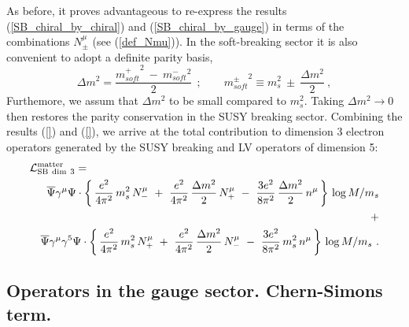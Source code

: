 \documentclass[paper,12pt]{revtex4}
\begin{document}
	As before, it proves advantageous to re-express the results (\ref{SB_chiral_by_chiral})
	and (\ref{SB_chiral_by_gauge}) in terms of the combinations
	$ N_\pm^\mu $ (see (\ref{def_Nmu})).  In the soft-breaking sector it is also convenient 
	to adopt a definite parity basis,
\begin{equation}
	\Delta m^2 = \frac{ {m_{soft}^+}^2 ~ - ~ {m_{soft}^-}^2 }
			  {                  2                  }~~;
	\qquad
	{m_{soft}^\pm}^2 \equiv m_s^2 ~\pm~ \frac{\Delta m^2}{2}~,
\end{equation}
	Furthemore, we assum that  $ \Delta m^2 $ to be small compared to $m_s^2$. 
	Taking $ \Delta m^2 \to 0 $ then restores the parity conservation 
	in the SUSY breaking sector. 
	Combining the results (\ref{}) and (\ref{}), we arrive at the total contribution 
to dimension 3 electron operators generated by the SUSY breaking and LV operators of dimension 5:
\begin{eqnarray}
\nonumber
\lefteqn{
        \mathcal{L}_{\rm{SB\ dim\ 3}}^{\rm matter} = 
	} \\
\nonumber
        &&
	\overline{\Psi} \gamma^\mu \Psi \cdot
	\left\{\,
	        \frac{e^2}{4\pi^2}\, m_s^2\, N_-^\mu 
		~+~
		\frac{e^2}{4\pi^2}\, \frac{\Delta m^2}{2}\, N_+^\mu 
		~-~
		\frac{3e^2}{8\pi^2}\, \frac{\Delta m^2}{2}\, n^\mu
	       \,
	\right\}\, \log M/m_s \\
\label{LV_induced_dim3}
	&& \qquad\qquad\qquad\qquad\qquad\qquad\qquad\ + \\
\nonumber
	&&
	\overline{\Psi} \gamma^\mu \gamma^5 \Psi \cdot
	\left\{\,
	        \frac{e^2}{4\pi^2}\, m_s^2\, N_+^\mu 
		~+~
		\frac{e^2}{4\pi^2}\, \frac{\Delta m^2}{2}\, N_-^\mu 
		~-~
		\frac{3e^2}{8\pi^2}\, m_s^2\, n^\mu
	       \,
	\right\}\, \log M/m_s~.
\end{eqnarray}

\subsection{Operators in the gauge sector. Chern-Simons term.}
\label{SB_gauge_sector}
    
\end{document}
